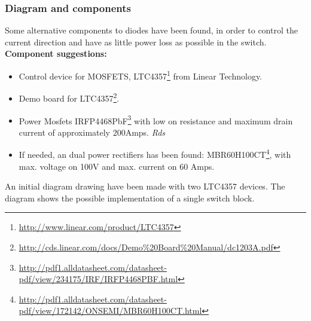\subsubsection{Diagram and components}
Some alternative components to diodes have been found, in order to control the current direction and have as little power loss as possible in the switch. 
\\\textbf{Component suggestions:}
\begin{itemize}
	\item Control device for MOSFETS, LTC4357\footnote{\url{http://www.linear.com/product/LTC4357}} from Linear Technology.
	\item Demo board for LTC4357\footnote{\url{http://cds.linear.com/docs/Demo\%20Board\%20Manual/dc1203A.pdf}}.
	\item Power Mosfets IRFP4468PbF\footnote{\url{http://pdf1.alldatasheet.com/datasheet-pdf/view/234175/IRF/IRFP4468PBF.html}} with low on resistance and maximum drain current of approximately 200Amps. \textit{Rds}
	\item If needed, an dual power rectifiers has been found: MBR60H100CT\footnote{\url{http://pdf1.alldatasheet.com/datasheet-pdf/view/172142/ONSEMI/MBR60H100CT.html}}, with max. voltage on 100V and max. current on 60 Amps.
\end{itemize}
An initial diagram drawing have been made with two LTC4357 devices. The diagram shows the possible implementation of a single switch block.


